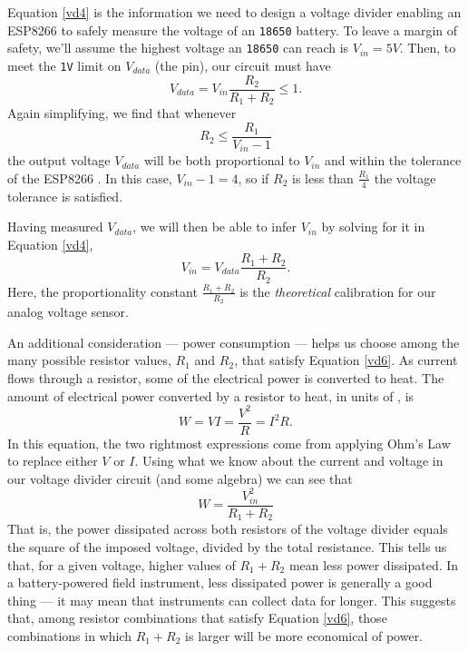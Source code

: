 Equation \ref{vd4} is the information we need to design a voltage divider enabling an ESP8266 \adc to safely measure the voltage of an \texttt{18650} battery.
To leave a margin of safety, we'll assume the highest voltage an \texttt{18650} can reach is $V_{in}=5V$. Then, to meet the \texttt{1V} limit on $V_{data}$ (the \adc pin), our circuit must have
\begin{equation}\label{vd5}
V_{data} = V_{in} \frac{R_2}{R_1+R_2}  \le 1 .
\end{equation}
Again simplifying, we find that whenever
\begin{equation}\label{vd6}
R_2 \le \frac{R_1}{V_{in}-1} %
\end{equation}
the output voltage $V_{data}$ will be both proportional to $V_{in}$ and within the tolerance of the ESP8266 \adc.
In this case, $V_{in}-1 = 4$, so if $R_2$ is less than $\frac{R_1}{4}$ the voltage tolerance is satisfied.

Having measured $V_{data}$, we will then be able to infer $V_{in}$ by solving for it in Equation \ref{vd4},
\begin{equation}\label{vd7}
V_{in} = V_{data} \frac{R_1+R_2}{R_2}.
\end{equation}
Here, the proportionality constant $\frac{R_1+R_2}{R_2}$ is the \emph{theoretical} calibration for our analog voltage sensor.

An additional consideration --- power consumption --- helps us choose among the many possible resistor values, $R_1$ and $R_2$, that satisfy Equation \ref{vd6}.
As current flows through a resistor, some of the electrical power is converted to heat.
The amount of electrical power converted by a resistor to heat, in units of , is
\begin{equation}\label{watts}
W = V I = \frac{V^2}{R} = I^2 R.
\end{equation}
In this equation, the two rightmost expressions come from applying Ohm's Law to replace either $V$ or $I$.
Using what we know about the current and voltage in our voltage divider circuit (and some algebra) we can see that
\begin{equation}\label{watts2}
W = \frac{V_{in}^2}{R_1+R_2}
\end{equation}
That is, the power dissipated across both resistors of the voltage divider equals the square of the imposed voltage, divided by the total resistance.
This tells us that, for a given voltage, higher values of $R_1+R_2$ mean less power dissipated.
In a battery-powered field instrument, less dissipated power is generally a good thing --- it may mean that instruments can collect data for longer.
This suggests that, among resistor combinations that satisfy  Equation \ref{vd6}, those combinations in which $R_1+R_2$ is larger will be more economical of power.

